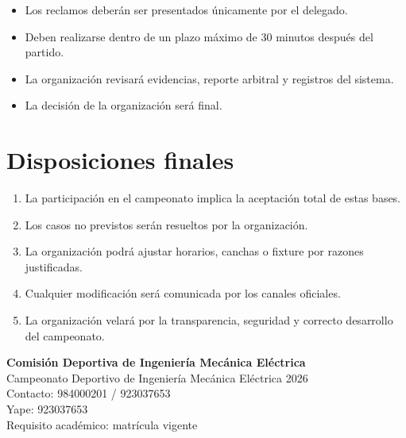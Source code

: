 \documentclass[12pt,a4paper]{article}
\newcommand{\numeroYape}{923037653}
\newcommand{\numeroContacto}{984000201 / 923037653}
\newcommand{\nombreCampeonato}{Campeonato Deportivo de Ingeniería Mecánica Eléctrica 2026}
\newcommand{\organizador}{Comisión Deportiva de Ingeniería Mecánica Eléctrica}
\begin{document}
	\begin{itemize}
		\item Los reclamos deberán ser presentados únicamente por el delegado.
		\item Deben realizarse dentro de un plazo máximo de 30 minutos después del partido.
		\item La organización revisará evidencias, reporte arbitral y registros del sistema.
		\item La decisión de la organización será final.
	\end{itemize}
	
	\section{Disposiciones finales}
	
	\begin{enumerate}
		\item La participación en el campeonato implica la aceptación total de estas bases.
		\item Los casos no previstos serán resueltos por la organización.
		\item La organización podrá ajustar horarios, canchas o fixture por razones justificadas.
		\item Cualquier modificación será comunicada por los canales oficiales.
		\item La organización velará por la transparencia, seguridad y correcto desarrollo del campeonato.
	\end{enumerate}
	
	\vfill
	
	\begin{center}
		\begin{tcolorbox}[
			enhanced,
			colback=imelight,
			colframe=imegreen,
			boxrule=0.8pt,
			arc=3mm,
			width=0.82\textwidth,
			left=3mm,
			right=3mm,
			top=3mm,
			bottom=3mm
			]
			\centering
			\textcolor{imegreenDark}{\textbf{\organizador}}\\
			\nombreCampeonato\\
			Contacto: \numeroContacto\\
			Yape: \numeroYape\\
			Requisito académico: matrícula vigente
		\end{tcolorbox}
	\end{center}
	
\end{document}
